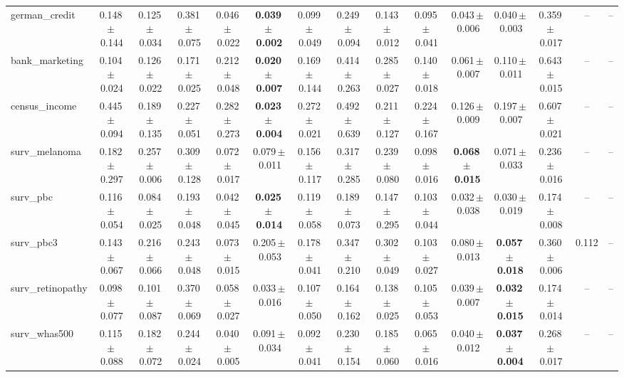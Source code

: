 \documentclass[8pt]{extarticle}
\begin{document}
\begin{longtable}{l*{14}{c}}
german\_credit & 0.148\,$\pm$\,0.144 & 0.125\,$\pm$\,0.034 & 0.381\,$\pm$\,0.075 & 0.046\,$\pm$\,0.022 & \textbf{0.039\,$\pm$\,0.002} & 0.099\,$\pm$\,0.049 & 0.249\,$\pm$\,0.094 & 0.143\,$\pm$\,0.012 & 0.095\,$\pm$\,0.041 & 0.043\,$\pm$\,0.006 & 0.040\,$\pm$\,0.003 & 0.359\,$\pm$\,0.017 & -- & -- \\
bank\_marketing & 0.104\,$\pm$\,0.024 & 0.126\,$\pm$\,0.022 & 0.171\,$\pm$\,0.025 & 0.212\,$\pm$\,0.048 & \textbf{0.020\,$\pm$\,0.007} & 0.169\,$\pm$\,0.144 & 0.414\,$\pm$\,0.263 & 0.285\,$\pm$\,0.027 & 0.140\,$\pm$\,0.018 & 0.061\,$\pm$\,0.007 & 0.110\,$\pm$\,0.011 & 0.643\,$\pm$\,0.015 & -- & -- \\
census\_income & 0.445\,$\pm$\,0.094 & 0.189\,$\pm$\,0.135 & 0.227\,$\pm$\,0.051 & 0.282\,$\pm$\,0.273 & \textbf{0.023\,$\pm$\,0.004} & 0.272\,$\pm$\,0.021 & 0.492\,$\pm$\,0.639 & 0.211\,$\pm$\,0.127 & 0.224\,$\pm$\,0.167 & 0.126\,$\pm$\,0.009 & 0.197\,$\pm$\,0.007 & 0.607\,$\pm$\,0.021 & -- & -- \\
surv\_melanoma & 0.182\,$\pm$\,0.297 & 0.257\,$\pm$\,0.006 & 0.309\,$\pm$\,0.128 & 0.072\,$\pm$\,0.017 & 0.079\,$\pm$\,0.011 & 0.156\,$\pm$\,0.117 & 0.317\,$\pm$\,0.285 & 0.239\,$\pm$\,0.080 & 0.098\,$\pm$\,0.016 & \textbf{0.068\,$\pm$\,0.015} & 0.071\,$\pm$\,0.033 & 0.236\,$\pm$\,0.016 & -- & -- \\
surv\_pbc & 0.116\,$\pm$\,0.054 & 0.084\,$\pm$\,0.025 & 0.193\,$\pm$\,0.048 & 0.042\,$\pm$\,0.045 & \textbf{0.025\,$\pm$\,0.014} & 0.119\,$\pm$\,0.058 & 0.189\,$\pm$\,0.073 & 0.147\,$\pm$\,0.295 & 0.103\,$\pm$\,0.044 & 0.032\,$\pm$\,0.038 & 0.030\,$\pm$\,0.019 & 0.174\,$\pm$\,0.008 & -- & -- \\
surv\_pbc3 & 0.143\,$\pm$\,0.067 & 0.216\,$\pm$\,0.066 & 0.243\,$\pm$\,0.048 & 0.073\,$\pm$\,0.015 & 0.205\,$\pm$\,0.053 & 0.178\,$\pm$\,0.041 & 0.347\,$\pm$\,0.210 & 0.302\,$\pm$\,0.049 & 0.103\,$\pm$\,0.027 & 0.080\,$\pm$\,0.013 & \textbf{0.057\,$\pm$\,0.018} & 0.360\,$\pm$\,0.006 & 0.112 & -- \\
surv\_retinopathy & 0.098\,$\pm$\,0.077 & 0.101\,$\pm$\,0.087 & 0.370\,$\pm$\,0.069 & 0.058\,$\pm$\,0.027 & 0.033\,$\pm$\,0.016 & 0.107\,$\pm$\,0.050 & 0.164\,$\pm$\,0.162 & 0.138\,$\pm$\,0.025 & 0.105\,$\pm$\,0.053 & 0.039\,$\pm$\,0.007 & \textbf{0.032\,$\pm$\,0.015} & 0.174\,$\pm$\,0.014 & -- & -- \\
surv\_whas500 & 0.115\,$\pm$\,0.088 & 0.182\,$\pm$\,0.072 & 0.244\,$\pm$\,0.024 & 0.040\,$\pm$\,0.005 & 0.091\,$\pm$\,0.034 & 0.092\,$\pm$\,0.041 & 0.230\,$\pm$\,0.154 & 0.185\,$\pm$\,0.060 & 0.065\,$\pm$\,0.016 & 0.040\,$\pm$\,0.012 & \textbf{0.037\,$\pm$\,0.004} & 0.268\,$\pm$\,0.017 & -- & -- \\

\end{longtable}
\end{document}
